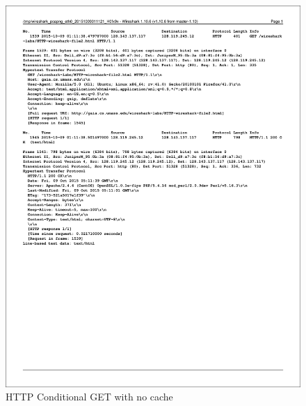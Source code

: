 \documentclass[titlepage, paper=a4, fontsize=11pt]{scrartcl} %
\numberwithin{equation}{section} %
\numberwithin{figure}{section} %
\numberwithin{table}{section} %
\begin{document}
\begin{figure}[!ht]
    \centering
    \includegraphics[width=\textwidth]{images/cond-get1.pdf}
    \caption{HTTP Conditional GET with no cache}
    \label{fig:cond-get1}
\end{figure}
\end{document}
